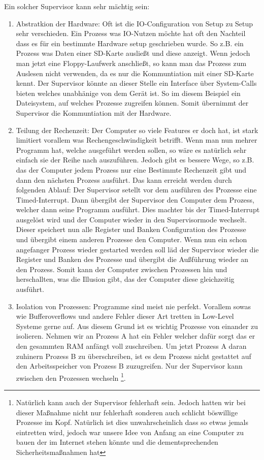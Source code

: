 \documentclass{scrartcl}
\begin{document}
Ein solcher Supervisor kann sehr mächtig sein:

\begin{enumerate}
	\item Abstratkion der Hardware: Oft ist die IO-Configuration von Setup zu Setup sehr verschieden. Ein Prozess was IO-Nutzen möchte hat oft den Nachteil dass es für ein bestimmte Hardware setup geschrieben wurde. So z.B. ein Prozess was Daten einer SD-Karte ausließt und diese anzeigt. Wenn jedoch man jetzt eine Floppy-Laufwerk anschließt, so kann man das Prozess zum Auslesen nicht verwenden, da es nur die Kommuntiation mit einer SD-Karte kennt. Der Supervisor könnte an dieser Stelle ein Interface über System-Calls bieten welches unabhänige von dem Gerät ist. So im diesem Beispiel ein Dateisystem, auf welches Prozesse zugreifen können. Somit übernimmt der Supervisor die Kommuntiation mit der Hardware.
	
	\item Teilung der Rechenzeit: Der Computer so viele Features er doch hat, ist stark limitiert vorallem was Rechengeschwindigkeit betrifft. Wenn man nun mehrer Programm hat, welche ausgeführt werden sollen, so wäre es natürlich sehr einfach sie der Reihe nach auszuführen. Jedoch gibt es bessere Wege, so z.B. das der Computer jedem Prozess nur eine Bestimmte Rechenzeit gibt und dann den nächsten Prozess ausführt. Das kann erreicht werden durch folgenden Ablauf: Der Supervisor setellt vor dem ausführen des Prozesse eine Timed-Interrupt. Dann übergibt der Supervisor den Computer dem Prozess, welcher dann seine Programm ausführt. Dies machter bis der Timed-Interrupt ausgelöst wird und der Computer wieder in den Supervisormode wechselt. Dieser speichert nun alle Register und Banken Configuration des Prozesse und übergibt einem anderen Prozesse den Computer. Wenn nun ein schon angefanger Prozess wieder gestarted werden soll läd der Supervisor wieder die Register und Banken des Prozesse und übergibt die Außführung wieder an den Prozess. Somit kann der Computer zwischen Prozessen hin und herschallten, was die Illusion gibt, das der Computer diese gleichzeitig ausführt.
	
	\item Isolation von Prozessen: Programme sind meist nie perfekt. Vorallem sowas wie Bufferoverflows und andere Fehler dieser Art tretten in Low-Level Systeme gerne auf. Aus diesem Grund ist es wichtig Prozesse von einander zu isolieren. Nehmen wir an Prozess A hat ein Fehler welcher dafür sorgt das er den gesammten RAM anfängt voll zuschreiben. Um jetzt Prozess A daran zuhinern Prozess B zu überschreiben, ist es dem Prozess nicht gestattet auf den Arbeitsspeicher von Prozess B zuzugreifen. Nur der Supervisor kann zwischen den Prozessen wechseln
	\footnote{Natürlich kann auch der Supervisor fehlerhaft sein. Jedoch hatten wir bei dieser Maßnahme nicht nur fehlerhaft sonderen auch schlicht böswillige Prozesse im Kopf. Natürlich ist dies unwahrscheinlich dass so etwas jemals eintretten wird, jedoch war unsere Idee von Anfang an eine Computer zu bauen der im Internet stehen könnte und die dementsprechenden Sicherheitsmaßnahmen hat}.
\end{enumerate}
\end{document}
